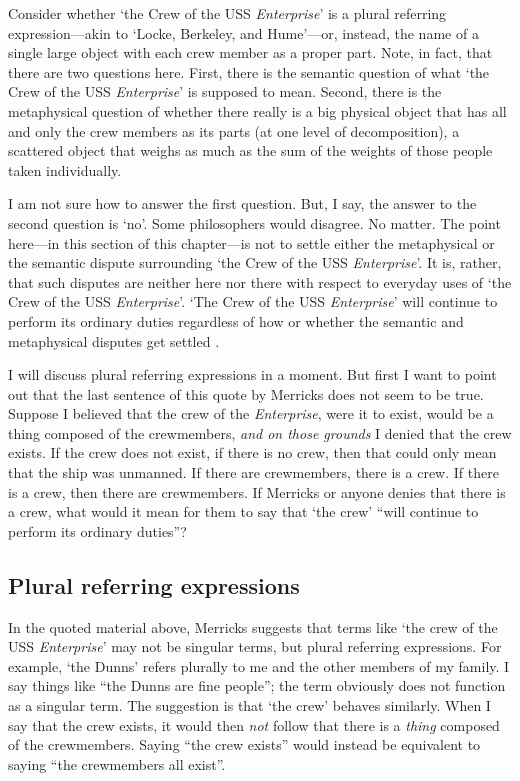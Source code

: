 \documentclass[11pt]{article}
\newenvironment{squote}{%
\begin{spacing}{1}
       	\begin{list}{}{%
\setlength{\labelwidth}{0pt}%
\rightmargin\leftmargin%
}
\item\relax
}{%
\end{list}%
\end{spacing}
}
\begin{document}
\begin{spacing}{1.25}
\begin{squote}
Consider whether `the Crew of the USS {\em Enterprise}' is a plural
referring expression---akin to `Locke, Berkeley, and Hume'---or,
instead, the name of a single large object with each crew member as a
proper part.  Note, in fact, that there are two questions here.
First, there is the semantic question of what `the Crew of the USS
{\em Enterprise}' is supposed to mean.  Second, there is the
metaphysical question of whether there really is a big physical object
that has all and only the crew members as its parts (at one level of
decomposition), a scattered object that weighs as much as the sum of
the weights of those people taken individually.

I am not sure how to answer the first question.  But, I say, the
answer to the second question is `no'.  Some philosophers would
disagree.  No matter.  The point here---in this section of this
chapter---is not to settle either the metaphysical or the semantic
dispute surrounding `the Crew of the USS {\em Enterprise}'.  It is,
rather, that such disputes are neither here nor there with respect to
everyday uses of `the Crew of the USS {\em Enterprise}'.  `The Crew of
the USS {\em Enterprise}' will continue to perform its ordinary duties
regardless of how or whether the semantic and metaphysical disputes
get settled \citeyearpar[10]{merricks2001a}.
\end{squote}

I will discuss plural referring expressions in a moment.  But first I
want to point out that the last sentence of this quote by Merricks
does not seem to be true.  Suppose I believed that the crew of the
{\em Enterprise}, were it to exist, would be a thing composed of the
crewmembers, {\em and on those grounds} I denied that the crew exists.
If the crew does not exist, if there is no crew, then that could only
mean that the ship was unmanned.  If there are crewmembers, there is a
crew.  If there is a crew, then there are crewmembers.  If Merricks or
anyone denies that there is a crew, what would it mean for them to say
that `the crew' ``will continue to perform its ordinary duties''?

\subsection{Plural referring expressions}
\label{plural-ref}
In the quoted material above, Merricks suggests that terms like `the
crew of the USS {\em Enterprise}' may not be singular terms, but
plural referring expressions.  For example, `the Dunns' refers
plurally to me and the other members of my family.  I say things like
``the Dunns are fine people''; the term obviously does not function as
a singular term.  The suggestion is that `the crew' behaves similarly.
When I say that the crew exists, it would then {\em not} follow that
there is a {\em thing} composed of the crewmembers.  Saying ``the crew
exists'' would instead be equivalent to saying ``the crewmembers all
exist''.


\end{spacing}
\end{document}
